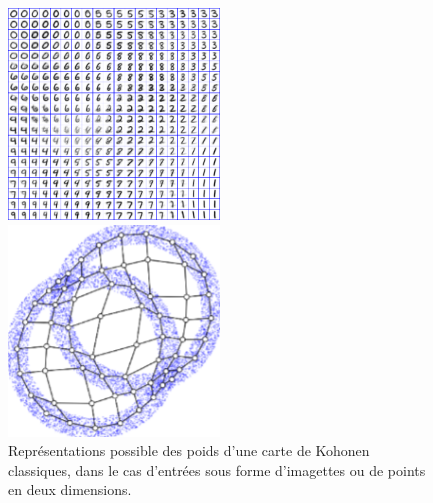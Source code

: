 \begin{figure}
\begin{minipage}{0.5\textwidth}
\centering
\includegraphics[width=0.5\textwidth]{digits.jpg}
\end{minipage}
\begin{minipage}{0.5\textwidth}
\centering
\includegraphics[width=0.5\textwidth]{points.png}
\end{minipage}
\label{fig:representation}
\caption{Représentations possible des poids d'une carte de Kohonen classiques, dans le cas d'entrées sous forme d'imagettes ou de points en deux dimensions.}
\end{figure}

